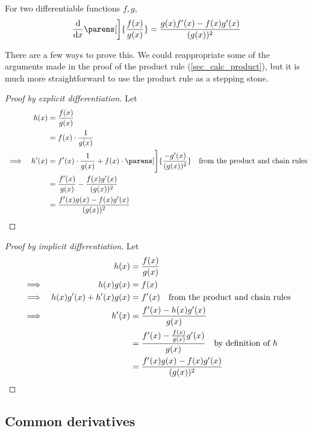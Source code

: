 \begin{theorem}
For two differentiable functions \(f, g\),
\begin{equation*}
    \dv{x}\parens[\bigg]{\frac{f(x)}{g(x)}} = \frac{g(x)f'(x) - f(x)g'(x)}{(g(x))^2}
\end{equation*}
\end{theorem}
There are a few ways to prove this. We could reappropriate some of the arguments
made in the proof of the product rule (\ref{sec_calc_product}), but it is much
more straightforward to use the product rule as a stepping stone.
\begin{proof}[Proof by explicit differentiation]
    Let
    \begin{alignat*}{2}
        && h(x) &= \frac{f(x)}{g(x)} \\
        &&      &= f(x) \cdot \frac 1{g(x)} \\
        &\implies& h'(x)
                &= f'(x) \cdot \frac 1{g(x)}
                    + f(x) \cdot \parens[\Bigg]{\frac{-g'(x)}{(g(x))^2}}
                    \quad \text{from the product and chain rules} \\
        &&      &= \frac{f'(x)}{g(x)} - \frac{f(x)g'(x)}{(g(x))^2} \\
        &&      &= \frac{f'(x)g(x) - f(x)g'(x)}{(g(x))^2} \qedhere
    \end{alignat*}
\end{proof}
\begin{proof}[Proof by implicit differentiation]
    Let
    \begin{alignat*}{2}
        && h(x) &= \frac{f(x)}{g(x)} \\
        &\implies& h(x)g(x) &= f(x) \\
        &\implies& h(x)g'(x) + h'(x)g(x)
                &= f'(x) \quad \text{from the product and chain rules} \\
        &\implies& h'(x)
                &= \frac{f'(x) - h(x)g'(x)}{g(x)} \\
        &&      &= \frac{f'(x) - \frac{f(x)}{g(x)}g'(x)}{g(x)}
                    \quad \text{by definition of \(h\)} \\
        &&      &= \frac{f'(x)g(x) - f(x)g'(x)}{(g(x))^2} \qedhere
    \end{alignat*}
\end{proof}

\subsection{Common derivatives} \label{calc_common}

